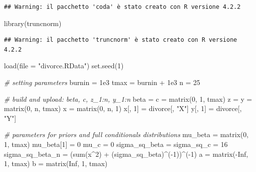 \documentclass[
  11pt,
]{article}
\newenvironment{Shaded}{\begin{snugshade}}{\end{snugshade}}
\newcommand{\AttributeTok}[1]{\textcolor[rgb]{0.77,0.63,0.00}{#1}}
\newcommand{\CommentTok}[1]{\textcolor[rgb]{0.56,0.35,0.01}{\textit{#1}}}
\newcommand{\ConstantTok}[1]{\textcolor[rgb]{0.00,0.00,0.00}{#1}}
\newcommand{\DecValTok}[1]{\textcolor[rgb]{0.00,0.00,0.81}{#1}}
\newcommand{\FloatTok}[1]{\textcolor[rgb]{0.00,0.00,0.81}{#1}}
\newcommand{\FunctionTok}[1]{\textcolor[rgb]{0.00,0.00,0.00}{#1}}
\newcommand{\NormalTok}[1]{#1}
\newcommand{\OtherTok}[1]{\textcolor[rgb]{0.56,0.35,0.01}{#1}}
\newcommand{\SpecialCharTok}[1]{\textcolor[rgb]{0.00,0.00,0.00}{#1}}
\newcommand{\StringTok}[1]{\textcolor[rgb]{0.31,0.60,0.02}{#1}}
\begin{document}
\begin{verbatim}
## Warning: il pacchetto 'coda' è stato creato con R versione 4.2.2
\end{verbatim}

\begin{Shaded}
\begin{Highlighting}[]
\FunctionTok{library}\NormalTok{(truncnorm)}
\end{Highlighting}
\end{Shaded}

\begin{verbatim}
## Warning: il pacchetto 'truncnorm' è stato creato con R versione 4.2.2
\end{verbatim}

\begin{Shaded}
\begin{Highlighting}[]
\FunctionTok{load}\NormalTok{(}\AttributeTok{file =} \StringTok{"divorce.RData"}\NormalTok{)}
\FunctionTok{set.seed}\NormalTok{(}\DecValTok{1}\NormalTok{)}

\CommentTok{\# setting parameters}
\NormalTok{burnin }\OtherTok{=} \FloatTok{1e3}
\NormalTok{tmax }\OtherTok{=}\NormalTok{ burnin }\SpecialCharTok{+} \FloatTok{1e3}
\NormalTok{n }\OtherTok{=} \DecValTok{25}

\CommentTok{\# build and upload: beta, c, z\_1:n, y\_1:n}
\NormalTok{beta }\OtherTok{=}\NormalTok{ c }\OtherTok{=} \FunctionTok{matrix}\NormalTok{(}\DecValTok{0}\NormalTok{, }\DecValTok{1}\NormalTok{, tmax)}
\NormalTok{z }\OtherTok{=}\NormalTok{ y }\OtherTok{=} \FunctionTok{matrix}\NormalTok{(}\DecValTok{0}\NormalTok{, n, tmax)}
\NormalTok{x }\OtherTok{=} \FunctionTok{matrix}\NormalTok{(}\DecValTok{0}\NormalTok{, n, }\DecValTok{1}\NormalTok{)}
\NormalTok{x[, }\DecValTok{1}\NormalTok{] }\OtherTok{=}\NormalTok{ divorce[, }\StringTok{"X"}\NormalTok{]}
\NormalTok{y[, }\DecValTok{1}\NormalTok{] }\OtherTok{=}\NormalTok{ divorce[, }\StringTok{"Y"}\NormalTok{]}

\CommentTok{\# parameters for priors and full conditionals distributions}
\NormalTok{mu\_beta }\OtherTok{=} \FunctionTok{matrix}\NormalTok{(}\DecValTok{0}\NormalTok{, }\DecValTok{1}\NormalTok{, tmax)}
\NormalTok{mu\_beta[}\DecValTok{1}\NormalTok{] }\OtherTok{=} \DecValTok{0}
\NormalTok{mu\_c }\OtherTok{=} \DecValTok{0}
\NormalTok{sigma\_sq\_beta }\OtherTok{=}\NormalTok{ sigma\_sq\_c }\OtherTok{=} \DecValTok{16}
\NormalTok{sigma\_sq\_beta\_n }\OtherTok{=}\NormalTok{ (}\FunctionTok{sum}\NormalTok{(x}\SpecialCharTok{\^{}}\DecValTok{2}\NormalTok{) }\SpecialCharTok{+}\NormalTok{ (sigma\_sq\_beta)}\SpecialCharTok{\^{}}\NormalTok{(}\SpecialCharTok{{-}}\DecValTok{1}\NormalTok{))}\SpecialCharTok{\^{}}\NormalTok{(}\SpecialCharTok{{-}}\DecValTok{1}\NormalTok{)}
\NormalTok{a }\OtherTok{=} \FunctionTok{matrix}\NormalTok{(}\SpecialCharTok{{-}}\ConstantTok{Inf}\NormalTok{, }\DecValTok{1}\NormalTok{, tmax)}
\NormalTok{b }\OtherTok{=} \FunctionTok{matrix}\NormalTok{(}\ConstantTok{Inf}\NormalTok{, }\DecValTok{1}\NormalTok{, tmax)}


\end{Highlighting}
\end{Shaded}
\end{document}
